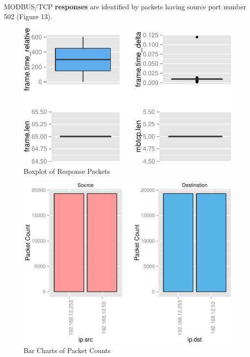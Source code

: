 \documentclass[11pt,]{article}
\begin{document}
MODBUS/TCP \textbf{responses} are identified by packets having source
port number 502 (Figure 13).

\begin{figure}[h]

{\centering \includegraphics{thesis_files/figure-latex/unnamed-chunk-23-1} 

}

\caption{Boxplot of Response Packets}\label{fig:unnamed-chunk-23}
\end{figure}

\clearpage

\begin{figure}[h]

{\centering \includegraphics{thesis_files/figure-latex/unnamed-chunk-24-1} 

}

\caption{Bar Charts of Packet Counts}\label{fig:unnamed-chunk-24}
\end{figure}
\end{document}
